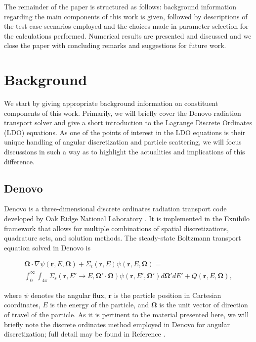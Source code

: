 \documentclass{article} %
\newcommand{\bo}{\mathbf\Omega}
\newcommand{\vecr}{\textbf{r}}
\begin{document}

The remainder of the paper is structured as follows: background information
regarding the main components of this work is given, followed by descriptions
of the test case scenarios employed and the choices made in parameter selection
for the calculations performed. Numerical results are presented and discussed
and we close the paper with concluding remarks and suggestions for future work.

\section{Background}
\label{sec:background}

We start by giving appropriate background information on constituent components
of this work. Primarily, we will briefly cover the Denovo radiation transport
solver and give a short introduction to the Lagrange Discrete Ordinates (LDO)
equations. As one of the points of interest in the LDO equations is their
unique handling of angular discretization and particle scattering, we will
focus discussions in such a way as to highlight the actualities and
implications of this difference.

\subsection{Denovo}

Denovo is a three-dimensional discrete ordinates radiation transport code
developed by Oak Ridge National Laboratory \cite{denovo}. It is implemented in
the Exnihilo framework that allows for multiple combinations of spatial
discretizations, quadrature sets, and solution methods. The steady-state
Boltzmann transport equation solved in Denovo is

\begin{multline}
\bo \cdot \nabla \psi(\vecr,E,\bo) + \Sigma_t(\vecr,E) \psi(\vecr,E,\bo) = \\
\int_0^\infty\int_{4\pi} \Sigma_s(\vecr,E'\rightarrow E,\bo'\cdot\bo)
\psi(\vecr,E',\bo')d\bo'dE' + Q(\vecr,E,\bo),
\label{eq:bte}
\end{multline}

\noindent where $\psi$ denotes the angular flux, $\vecr$ is the particle
position in Cartesian coordinates, $E$ is the energy of the particle,
and $\bo$ is the unit vector of direction of travel of the particle. As it is
pertinent to the material presented here, we will briefly note the discrete
ordinates method employed in Denovo for angular discretization; full detail may
be found in Reference \cite{denovo}.
\end{document}
